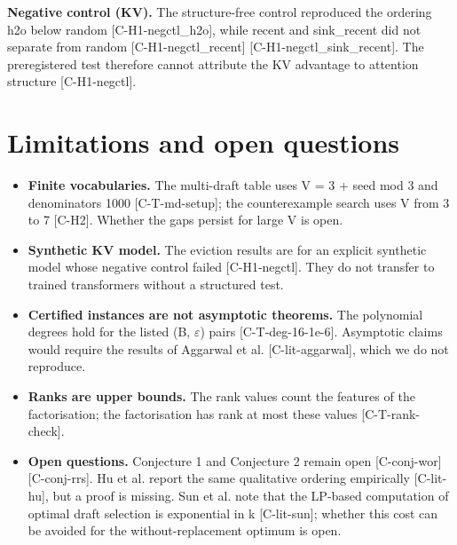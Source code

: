 \documentclass[10pt,twocolumn]{article}
\begin{document}
\textbf{Negative control (KV).} The structure-free control reproduced the ordering h2o below random {\scriptsize[C-H1-negctl\_h2o]}, while recent and sink\_recent did not separate from random {\scriptsize[C-H1-negctl\_recent]} {\scriptsize[C-H1-negctl\_sink\_recent]}. The preregistered test therefore cannot attribute the KV advantage to attention structure {\scriptsize[C-H1-negctl]}.

\section{Limitations and open questions}

\begin{itemize}
\item \textbf{Finite vocabularies.} The multi-draft table uses V = 3 + seed mod 3 and denominators 1000 {\scriptsize[C-T-md-setup]}; the counterexample search uses V from 3 to 7 {\scriptsize[C-H2]}. Whether the gaps persist for large V is open.
\item \textbf{Synthetic KV model.} The eviction results are for an explicit synthetic model whose negative control failed {\scriptsize[C-H1-negctl]}. They do not transfer to trained transformers without a structured test.
\item \textbf{Certified instances are not asymptotic theorems.} The polynomial degrees hold for the listed (B, $\varepsilon$) pairs {\scriptsize[C-T-deg-16-1e-6]}. Asymptotic claims would require the results of Aggarwal et al. {\scriptsize[C-lit-aggarwal]}, which we do not reproduce.
\item \textbf{Ranks are upper bounds.} The rank values count the features of the factorisation; the factorisation has rank at most these values {\scriptsize[C-T-rank-check]}.
\item \textbf{Open questions.} Conjecture 1 and Conjecture 2 remain open {\scriptsize[C-conj-wor]} {\scriptsize[C-conj-rrs]}. Hu et al. report the same qualitative ordering empirically {\scriptsize[C-lit-hu]}, but a proof is missing. Sun et al. note that the LP-based computation of optimal draft selection is exponential in k {\scriptsize[C-lit-sun]}; whether this cost can be avoided for the without-replacement optimum is open.
\end{itemize}
\end{document}
